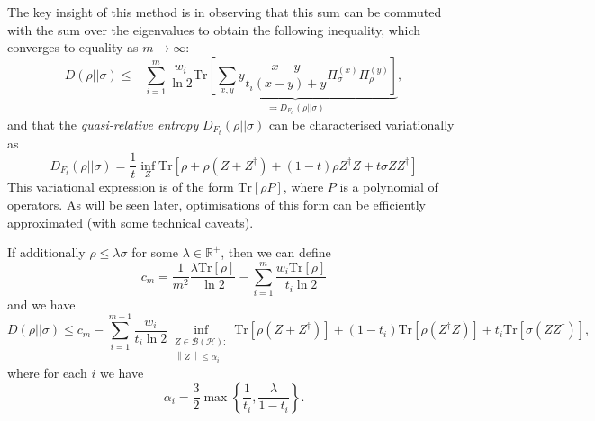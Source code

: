 \documentclass[10pt, a4paper]{article}
\numberwithin{equation}{section} %
\theoremstyle{definition}
\theoremstyle{plain}
\newcommand{\norm}[1]{\left\lVert#1\right\rVert}
\newcommand{\?}{\mathrel{?}} %
\newcommand{\R}{\mathbb{R}} %
\newcommand{\Tr}{\mathrm{Tr}} %
\newcommand{\Hs}{\mathcal{H}} %
\newcommand{\sB}{\mathcal{B}}
\begin{document}
      The key insight of this method is in observing that this sum can be commuted with the sum over the eigenvalues to obtain the following inequality, which converges to equality as \(m\to\infty\):
      \begin{equation}
        D(\rho||\sigma) \leq - \sum_{i=1}^{m} \frac{w_i}{\ln 2} \underbrace{\Tr\left[ \sum_{x,y} y \frac{x-y}{t_i(x-y)+y} \Pi^{(x)}_{\sigma} \Pi^{(y)}_{\rho} \right]}_{\eqqcolon D_{F_{t_i}}(\rho||\sigma)},\label{eqn:re_from_qre}
      \end{equation}
      and that the \emph{quasi-relative entropy} \(D_{F_{t}}(\rho||\sigma)\) can be characterised variationally as
      \begin{equation}
        D_{F_{t}}(\rho||\sigma) = \frac{1}{t} \inf_Z \Tr\left[ \rho + \rho(Z + Z^{\dagger}) + (1-t)\rho{}Z^{\dagger}Z + t\sigma{}ZZ^{\dagger} \right]\label{eqn:qre_var}
      \end{equation}
      This variational expression is of the form \(\Tr[\rho P]\), where \(P\) is a polynomial of operators. As will be seen later, optimisations of this form can be efficiently approximated (with some technical caveats).

      If additionally \(\rho \leq \lambda\sigma\) for some \(\lambda \in \R^+\), then we can define
      \begin{equation}
        c_m = \frac{1}{m^2} \frac{\lambda \Tr[\rho]}{\ln 2} - \sum_{i=1}^m \frac{w_i \Tr[\rho]}{t_i \ln 2}
      \end{equation}
      and we have
      \begin{equation}
        D(\rho||\sigma) \leq c_m -\sum_{i=1}^{m-1} \frac{w_i}{t_i \ln 2} \inf_{\substack{Z \in \sB(\Hs): \\ \norm{Z} \leq \alpha_i}} \Tr\left[\rho\left(Z + Z^{\dagger}\right)\right] + (1-t_i)\Tr\left[\rho\left(Z^{\dagger}Z\right)\right] + t_i\Tr\left[\sigma\left(ZZ^{\dagger}\right)\right],
      \end{equation}
      where for each \(i\) we have
      \begin{equation}\label{eqn:qre_bound}
        \alpha_i = \frac{3}{2} \max\left\{\frac{1}{t_i}, \frac{\lambda}{1-t_i}\right\}.
      \end{equation}
\end{document}
